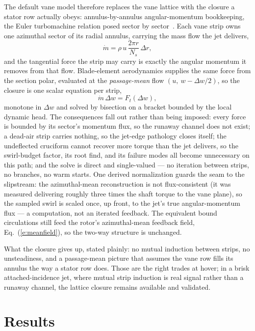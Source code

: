 \documentclass[]{aiaa-tc}%
\newcommand{\eqnref}[1]{(\ref{#1})}
\begin{document}
The default vane model therefore replaces the vane lattice with the
closure a stator row actually obeys: annulus-by-annulus
angular-momentum bookkeeping, the Euler turbomachine relation posed
sector by sector~\cite{dixon2014}. Each vane strip owns one azimuthal
sector of its radial annulus, carrying the mass flow the jet delivers,
\begin{equation}
 \label{e:mdot}
 \dot{m} = \rho\, u\, \frac{2\pi r}{N_s}\, \Delta r ,
\end{equation}
and the tangential force the strip may carry is exactly the angular
momentum it removes from that flow. Blade-element aerodynamics
supplies the same force from the section polar, evaluated at the
\emph{passage-mean} flow $(u,\ w - \Delta w/2)$, so the closure is one
scalar equation per strip,
\begin{equation}
 \label{e:cascade}
 \dot{m}\,\Delta w = F_t(\Delta w) ,
\end{equation}
monotone in $\Delta w$ and solved by bisection on a bracket bounded by
the local dynamic head. The consequences fall out rather than being
imposed: every force is bounded by its sector's momentum flux, so the
runaway channel does not exist; a dead-air strip carries nothing, so
the jet-edge pathology closes itself; the undeflected cruciform cannot
recover more torque than the jet delivers, so the swirl-budget factor,
its root find, and its failure modes all become unnecessary on this
path; and the solve is direct and single-valued --- no iteration
between strips, no branches, no warm starts. One derived normalization
guards the seam to the slipstream: the azimuthal-mean reconstruction
is not flux-consistent (it was measured delivering roughly three times
the shaft torque to the vane plane), so the sampled swirl is scaled
once, up front, to the jet's true angular-momentum flux --- a
computation, not an iterated feedback. The equivalent bound
circulations still feed the rotor's azimuthal-mean feedback field,
Eq.~\eqnref{e:meanfield}, so the two-way structure is unchanged.

What the closure gives up, stated plainly: no mutual induction between
strips, no unsteadiness, and a passage-mean picture that assumes the
vane row fills its annulus the way a stator row does. Those are the
right trades at hover; in a brisk attached-incidence jet, where mutual
strip induction is real signal rather than a runaway channel, the
lattice closure remains available and validated.

\section{Results}
\label{s:results}
\end{document}
